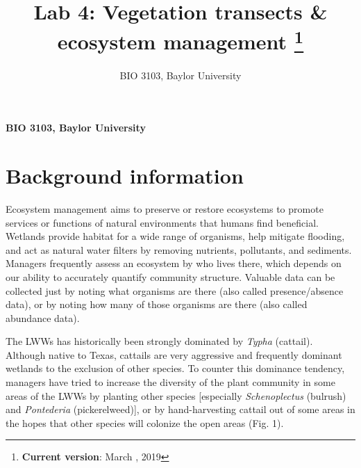 \documentclass[11pt,]{article}
\title{Lab 4: Vegetation transects \& ecosystem management \thanks{\textbf{Current version}: March , 2019}  }
\author{\Large BIO 3103, Baylor University\vspace{0.05in} \newline\normalsize\emph{}  }
\date{}
\newcommand*{\authorfont}{\fontfamily{phv}\selectfont}
\begin{document}
	
%



{%
\setlength{\parindent}{0pt}
\thispagestyle{plain}
{\fontsize{18}{20}\selectfont\raggedright 
\maketitle  %

}

{
   \vskip 13.5pt\relax \normalsize\fontsize{11}{12} 
\textbf{\authorfont BIO 3103, Baylor University} \hskip 15pt \emph{\small }   

}

}




\noindent  \hypertarget{background-information}{%
\section{Background information}\label{background-information}}

Ecosystem management aims to preserve or restore ecosystems to promote
services or functions of natural environments that humans find
beneficial. Wetlands provide habitat for a wide range of organisms, help
mitigate flooding, and act as natural water filters by removing
nutrients, pollutants, and sediments. Managers frequently assess an
ecosystem by who lives there, which depends on our ability to accurately
quantify community structure. Valuable data can be collected just by
noting what organisms are there (also called presence/absence data), or
by noting how many of those organisms are there (also called abundance
data).

The LWWs has historically been strongly dominated by \emph{Typha}
(cattail). Although native to Texas, cattails are very aggressive and
frequently dominant wetlands to the exclusion of other species. To
counter this dominance tendency, managers have tried to increase the
diversity of the plant community in some areas of the LWWs by planting
other species {[}especially \emph{Schenoplectus} (bulrush) and
\emph{Pontederia} (pickerelweed){]}, or by hand-harvesting cattail out
of some areas in the hopes that other species will colonize the open
areas (Fig. 1).
\end{document}
